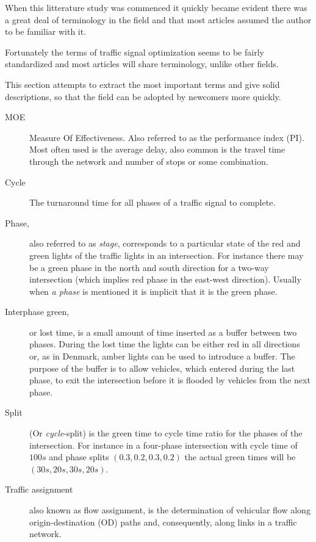 \label{vocabulary}
When this litterature study was commenced it quickly became evident there was a great deal of terminology in the field and that most articles assumed the author to be familiar with it. 

Fortunately the terms of traffic signal optimization seems to be fairly standardized and most articles will share terminology, unlike other fields.

This section attempts to extract the most important terms and give solid descriptions, so that the field can be adopted by newcomers more quickly.

\begin{description}

	\item[MOE] Measure Of Effectiveness. Also referred to as the performance index (PI).
	Most often used is the average delay, also common is the travel time through the network and number of stops or some combination.
			
	\item[Cycle] The turnaround time for all phases of a traffic signal to complete.
	
	\item[Phase,] also referred to as \textit{stage}, corresponds to a particular state of the red and green lights of the traffic lights in an intersection. 
	For instance there may be a green phase in the north and south direction for a two-way intersection (which implies red phase in the east-west direction). Usually when \textit{a phase} is mentioned it is implicit that it is the green phase.

\item[Interphase green,] or lost time, is a small amount of time inserted as a buffer between two phases. During the lost time the lights can be either red in all directions or, as in Denmark, amber lights can be used to introduce a buffer. The purpose of the buffer is to allow vehicles, which entered during the last phase, to exit the intersection before it is flooded by vehicles from the next phase.
	
	\item[Split] (Or \textit{cycle}-split) is the green time to cycle time ratio for the phases of the intersection. For instance in a four-phase intersection with cycle time of $100s$ and phase splits $\left( 0.3, 0.2, 0.3, 0.2 \right)$ the actual green times will be $\left( 30s, 20s, 30s, 20s \right)$. 
	
	\item[Traffic assignment] also known as flow assignment, is the determination of vehicular flow along origin-destination (OD) paths and, consequently, along links in a traffic network. 


\end{description}
